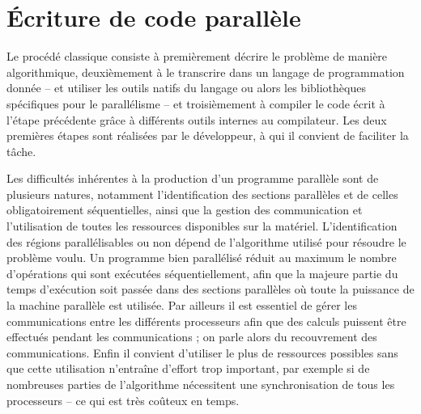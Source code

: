 \section{\'Ecriture de code parallèle}


Le procédé classique consiste à premièrement décrire le problème de manière algorithmique, deuxièmement à le transcrire dans un langage de programmation donnée -- et utiliser les outils natifs du langage ou alors les bibliothèques spécifiques pour le parallélisme -- et troisièmement à compiler le code écrit à l'étape précédente grâce à différents outils internes au compilateur. Les deux premières étapes sont réalisées par le développeur, à qui il convient de faciliter la tâche. 

Les difficultés inhérentes à la production d'un programme parallèle sont de plusieurs natures, notamment l'identification des sections parallèles et de celles obligatoirement séquentielles, ainsi que la gestion des communication et l'utilisation de toutes les ressources disponibles sur la matériel. L'identification des régions parallélisables ou non dépend de l'algorithme utilisé pour résoudre le problème voulu. Un programme bien parallélisé réduit au maximum le nombre d'opérations qui sont exécutées séquentiellement, afin que la majeure partie du temps d'exécution soit passée dans des sections parallèles où toute la puissance de la machine parallèle est utilisée. Par ailleurs il est essentiel de gérer les communications entre les différents processeurs afin que des calculs puissent être effectués pendant les communications ; on parle alors du recouvrement des communications. Enfin il convient d'utiliser le plus de ressources possibles sans que cette utilisation n'entraîne d'effort trop important, par exemple si de nombreuses parties de l'algorithme nécessitent une synchronisation de tous les processeurs -- ce qui est très coûteux en temps.

